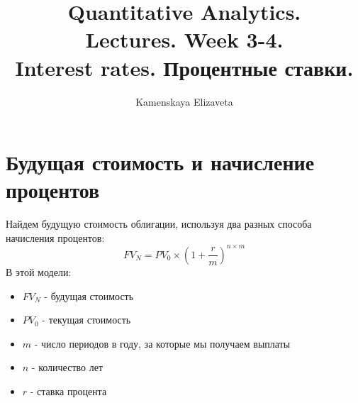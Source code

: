 \documentclass{article}
\title{Quantitative Analytics.\\
Lectures. Week 3-4. \\
Interest rates. Процентные ставки.}
\author{Kamenskaya Elizaveta}
\begin{document}
\maketitle

\setcounter{tocdepth}{1} %
\renewcommand\contentsname{Contents}
\tableofcontents
\newpage

\renewcommand{\labelitemi}{\tiny$\bullet$}
\renewcommand{\figurename}{Fig.}








 \section{Будущая стоимость и начисление процентов}
 Найдем будущую стоимость облигации, используя два разных способа начисления процентов:
\begin{equation*}
    FV_N = PV_0 \times (1 + \frac{r}{m})^{n\times m}
\end{equation*}
В этой модели:
\begin{itemize}
    \item $FV_N$ - будущая стоимость
    \item $PV_0$ - текущая стоимость
    \item $m$ - число периодов в году, за которые мы получаем выплаты
    \item $n$ - количество лет
    \item $r$ - ставка процента
\end{itemize}
\end{document}
